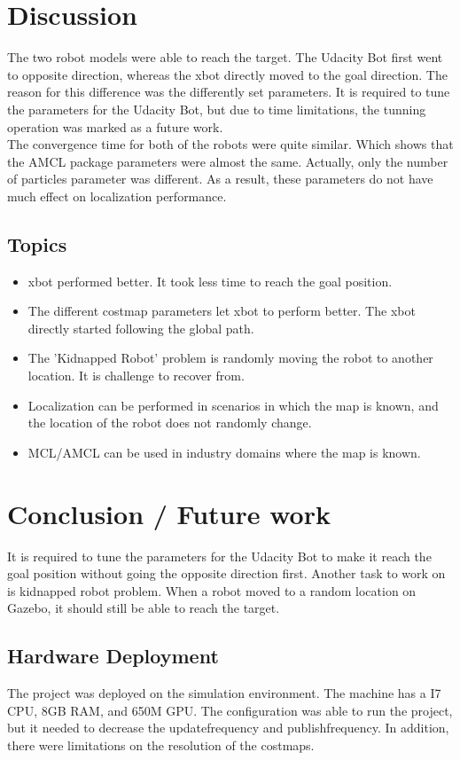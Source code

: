 \documentclass[10pt,journal,compsoc]{IEEEtran}
\begin{document}
\section{Discussion}
The two robot models were able to reach the target. The Udacity Bot first went to opposite direction, whereas the xbot directly moved to the goal direction. The reason for this difference was the differently set parameters. It is required to tune the parameters for the Udacity Bot, but due to time limitations, the tunning operation was marked as a future work. \\
The convergence time for both of the robots were quite similar. Which shows that the AMCL package parameters were almost the same. Actually, only the number of particles parameter was different. As a result, these parameters do not have much effect on localization performance.

\subsection{Topics}
\begin{itemize}
\item xbot performed better. It took less time to reach the goal position.
\item The different costmap parameters let xbot to perform better. The xbot directly started following the global path.
\item The 'Kidnapped Robot' problem is randomly moving the robot to another location. It is challenge to recover from.\cite{wiki:krp}
\item Localization can be performed in scenarios in which the map is known, and the location of the robot does not randomly change.
\item MCL/AMCL can be used in industry domains where the map is known.

\end {itemize}

\section{Conclusion / Future work}
It is required to tune the parameters for the Udacity Bot to make it reach the goal position without going the opposite direction first. Another task to work on is kidnapped robot problem. When a robot moved to a random location on Gazebo, it should still be able to reach the target.


\subsection{Hardware Deployment}
The project was deployed on the simulation environment. The machine has a I7 CPU, 8GB RAM, and 650M GPU. The configuration was able to run the project, but it needed to decrease the update\textunderscore frequency and publish\textunderscore frequency. In addition, there were limitations on the resolution of the costmaps.




\end{document}
